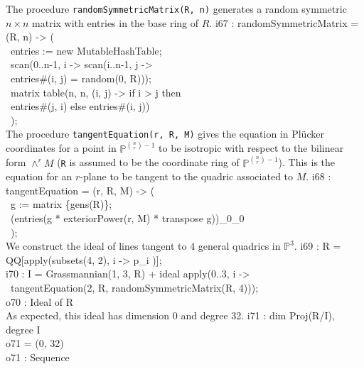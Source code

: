 The procedure {\tt randomSymmetricMatrix(R, n)}
generates a random symmetric $n\times n$ matrix with entries in 
the base ring of $R$.
%
\beginOutput
i67 : randomSymmetricMatrix = (R, n) -> (\\
\          entries := new MutableHashTable;\\
\          scan(0..n-1, i -> scan(i..n-1, j -> \\
\                       entries#(i, j) = random(0, R)));\\
\          matrix table(n, n, (i, j) -> if i > j then \\
\                       entries#(j, i) else entries#(i, j))\\
\          );\\
\endOutput
%
The procedure {\tt tangentEquation(r, R, M)} gives the equation in Pl\"ucker
coordinates for a point in ${\mathbb P}^{\binom{n}{r}-1}$ to be
isotropic with respect to the bilinear form  $\wedge^rM$
({\tt R} is assumed to be the coordinate ring of 
${\mathbb P}^{\binom{n}{r}-1}$).
This is the equation for an $r$-plane to be tangent to the quadric
associated to $M$.
%
\beginOutput
i68 : tangentEquation = (r, R, M) -> (\\
\           g := matrix \{gens(R)\};\\
\           (entries(g * exteriorPower(r, M) * transpose g))_0_0\\
\           );\\
\endOutput
%
We construct the ideal of lines tangent to 4 general quadrics in
${\mathbb P}^3$.
%
\beginOutput
i69 : R = QQ[apply(subsets(4, 2), i -> p_i )];\\
\endOutput
%
\beginOutput
i70 : I = Grassmannian(1, 3, R) + ideal apply(0..3, i -> \\
\           tangentEquation(2, R, randomSymmetricMatrix(R, 4)));\\
\emptyLine
o70 : Ideal of R\\
\endOutput
%
As expected, this ideal has dimension 0 and degree 32.
%
\beginOutput
i71 : dim Proj(R/I), degree I\\
\emptyLine
o71 = (0, 32)\\
\emptyLine
o71 : Sequence\\
\endOutput
%


